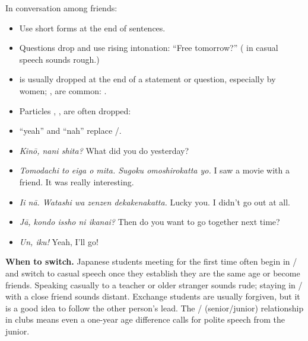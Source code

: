 In conversation among friends:
\begin{itemize}
  \item Use short forms at the end of sentences.
  \item Questions drop  and use rising intonation:  ``Free
        tomorrow?'' ( in casual speech sounds rough.)
  \item {} is usually dropped at the end of a statement or question, especially by
        women; ,  are common: .
  \item Particles , ,  are often dropped: 
  \item {} ``yeah'' and  ``nah'' replace /.
\end{itemize}

\begin{example}
\leavevmode
\begin{itemize}
  \item[A:]  \emph{Kinō, nani shita?}
        What did you do yesterday?
  \item[B:] 
        \emph{Tomodachi to eiga o mita. Sugoku omoshirokatta yo.}
        I saw a movie with a friend. It was really interesting.
  \item[A:] 
        \emph{Ii nā. Watashi wa zenzen dekakenakatta.}
        Lucky you. I didn't go out at all.
  \item[B:]  \emph{Jā, kondo issho ni ikanai?}
        Then do you want to go together next time?
  \item[A:]  \emph{Un, iku!} Yeah, I'll go!
\end{itemize}
\end{example}

\begin{aside}
\textbf{When to switch.} Japanese students meeting for the first time often begin in
/ and switch to casual speech once they establish they are the same
age or become friends. Speaking casually to a teacher or older stranger sounds rude;
staying in / with a close friend sounds distant. Exchange students
are usually forgiven, but it is a good idea to follow the other person's lead. The
/ (senior/junior) relationship in clubs means even a one-year
age difference calls for polite speech from the junior.
\end{aside}

